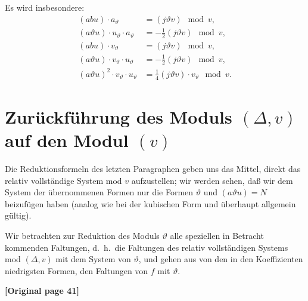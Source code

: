 \documentclass[12pt,a4paper]{article}
\begin{document}
Es wird insbesondere:
\begin{align*}
(abu) \cdot a_\vartheta &= (j\vartheta v) \mod v,\\
(a\vartheta u) \cdot u_\vartheta \cdot a_\vartheta &= -\tfrac{1}{2}(j\vartheta v) \mod v,\\
(abu) \cdot v_\vartheta &= (j\vartheta v) \mod v,\\
(a\vartheta u) \cdot v_\vartheta \cdot u_\vartheta &= -\tfrac{1}{2}(j\vartheta v) \mod v,\\
(a\vartheta u)^2 \cdot v_\vartheta \cdot u_\vartheta &= \tfrac{1}{4}(j\vartheta v) \cdot v_\vartheta \mod v.
\end{align*}

\section{Zurückführung des Moduls $(\varDelta, v)$ auf den Modul $(v)$}

Die Reduktionsformeln des letzten Paragraphen geben uns das Mittel, direkt das relativ vollständige System mod $v$ aufzustellen; wir werden sehen, daß wir dem System der übernommenen Formen nur die Formen $\vartheta$ und $(a\vartheta u) = N$ beizufügen haben (analog wie bei der kubischen Form und überhaupt allgemein gültig).

Wir betrachten zur Reduktion des Moduls $\vartheta$ alle speziellen in Betracht kommenden Faltungen, d.\ h.\ die Faltungen des relativ vollständigen Systems mod $(\varDelta, v)$ mit dem System von $\vartheta$, und gehen aus von den in den Koeffizienten niedrigsten Formen, den Faltungen von $f$ mit $\vartheta$.

\noindent\textbf{[Original page 41]}
\end{document}
